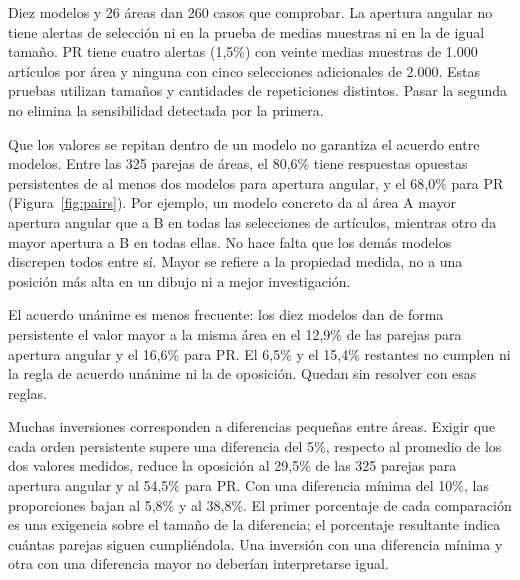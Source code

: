 \documentclass[12pt]{article}
\begin{document}
Diez modelos y 26 áreas dan 260 casos que comprobar. La apertura angular no tiene alertas de selección ni en la prueba de medias muestras ni en la de igual tamaño. PR tiene cuatro alertas (1,5\%) con veinte medias muestras de 1.000 artículos por área y ninguna con cinco selecciones adicionales de 2.000. Estas pruebas utilizan tamaños y cantidades de repeticiones distintos. Pasar la segunda no elimina la sensibilidad detectada por la primera.

Que los valores se repitan dentro de un modelo no garantiza el acuerdo entre modelos. Entre las 325 parejas de áreas, el 80,6\% tiene respuestas opuestas persistentes de al menos dos modelos para apertura angular, y el 68,0\% para PR (Figura~\ref{fig:pairs}). Por ejemplo, un modelo concreto da al área A mayor apertura angular que a B en todas las selecciones de artículos, mientras otro da mayor apertura a B en todas ellas. No hace falta que los demás modelos discrepen todos entre sí. Mayor se refiere a la propiedad medida, no a una posición más alta en un dibujo ni a mejor investigación.

El acuerdo unánime es menos frecuente: los diez modelos dan de forma persistente el valor mayor a la misma área en el 12,9\% de las parejas para apertura angular y el 16,6\% para PR. El 6,5\% y el 15,4\% restantes no cumplen ni la regla de acuerdo unánime ni la de oposición. Quedan sin resolver con esas reglas.

Muchas inversiones corresponden a diferencias pequeñas entre áreas. Exigir que cada orden persistente supere una diferencia del 5\%, respecto al promedio de los dos valores medidos, reduce la oposición al 29,5\% de las 325 parejas para apertura angular y al 54,5\% para PR. Con una diferencia mínima del 10\%, las proporciones bajan al 5,8\% y al 38,8\%. El primer porcentaje de cada comparación es una exigencia sobre el tamaño de la diferencia; el porcentaje resultante indica cuántas parejas siguen cumpliéndola. Una inversión con una diferencia mínima y otra con una diferencia mayor no deberían interpretarse igual.
\end{document}
